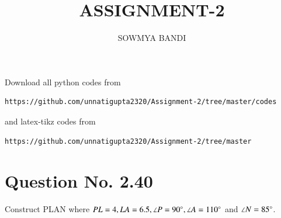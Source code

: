 \documentclass[journal,12pt,twocolumn]{IEEEtran}
\begin{document}
     \def\centbox#1{\makebox[0in]{#1}}
     \def\topbox#1{\raisebox{-\baselineskip}[0in][0in]{#1}}
     \def\midbox#1{\raisebox{-0.5\baselineskip}[0in][0in]{#1}}
\vspace{3cm}
\title{ASSIGNMENT-2}
\author{SOWMYA BANDI}
\maketitle
\newpage
\bigskip
\renewcommand{\thefigure}{\theenumi}
\renewcommand{\thetable}{\theenumi}
Download all python codes from 
\begin{lstlisting}
https://github.com/unnatigupta2320/Assignment-2/tree/master/codes
\end{lstlisting}
%
and latex-tikz codes from 
%
\begin{lstlisting}
https://github.com/unnatigupta2320/Assignment-2/tree/master
\end{lstlisting}
%
\section{Question No. 2.40}
Construct PLAN where $PL = 4, LA = 6.5, \angle P = 90 \degree, \angle A = 110 \degree$ and $\angle N = 85 \degree$.
%
\end{document}
